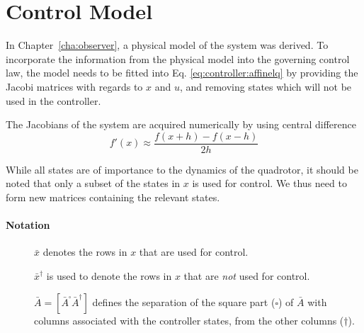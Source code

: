 \section{Control Model}
\label{sec:controller:model}
    In Chapter~\ref{cha:observer}, a physical model of the system
    was derived. To incorporate the information from the physical model
    into the governing control law, the model needs to be fitted into Eq.
    \eqref{eq:controller:affinelq} by providing the Jacobi matrices with
    regards to $x$ and $u$, and removing states which will not be
    used in the controller.

    The Jacobians of the system are acquired numerically by using
    central difference
    \begin{equation}
        f'(x) \approx \frac{f(x+h) - f(x-h)}{2h}
    \end{equation}

    While all states are of importance to the dynamics of the quadrotor,
    it should be noted that only a subset of the states in $x$ is used for control.
    We thus need to form new matrices containing the relevant states.
    \paragraph{Notation}
    \begin{description}
        \item[] $\bar{x}$ denotes the rows in $x$ that are used for control.
        \item[] $\bar{x}^{\dagger}$ is used to denote the rows in $x$ that are \textit{not} used for control.
        \item[] $\bar{A} = [ \bar{A}^{\square} \bar{A}^{\dagger}]$
        defines the separation of the square part ($\square$) of $\bar{A}$ with columns
        associated with the controller states, from the other columns ($\dagger$).
    \end{description}

